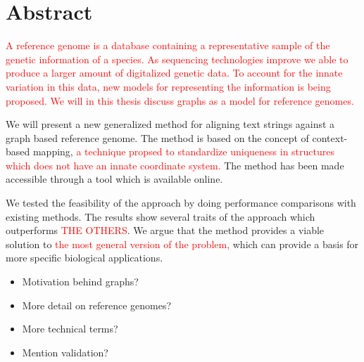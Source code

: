 \documentclass[thesis.tex]{subfiles}
\begin{document}
\chapter*{Abstract}
\textcolor{red}{A reference genome is a database containing a representative sample of the genetic information of a species. As sequencing technologies improve we able to produce a larger amount of digitalized genetic data. To account for the innate variation in this data, new models for representing the information is being proposed. We will in this thesis discuss graphs as a model for reference genomes.}\\
\par\noindent
We will present a new generalized method for aligning text strings against a graph based reference genome. The method is based on the concept of context-based mapping, \textcolor{red}{a technique propsed to standardize uniqueness in structures which does not have an innate coordinate system.} The method has been made accessible through a tool which is available online.\\
\par\noindent
We tested the feasibility of the approach by doing performance comparisons with existing methods. The results show several traits of the approach which outperforms \textcolor{red}{THE OTHERS}. We argue that the method provides a viable solution to \textcolor{red}{the most general version of the problem,} which can provide a basis for more specific biological applications.\\
\begin{itemize}
  \item Motivation behind graphs?
  \item More detail on reference genomes?
  \item More technical terms?
  \item Mention validation?
\end{itemize}
\end{document}
